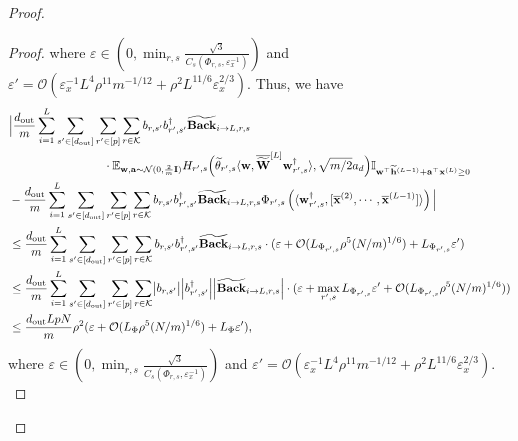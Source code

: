 \begin{claim}
\begin{proof}
\begin{proof}
					where $\varepsilon \in (0, \min_{r, s} \frac{\sqrt{3}}{C_s(\Phi_{r, s}, \varepsilon_x^{-1})})$ and  $\varepsilon' =  \mathcal{O}(\varepsilon_x^{-1} L^4 \rho^{11} m^{-1/12} + \rho^2 L^{11/6} \varepsilon_x^{2/3}).$ Thus, we have
					\begingroup \allowdisplaybreaks
					\begin{align}
						&\Big|\frac{d_{\mathrm{out}} }{m} \sum_{i=1}^{L}  \sum_{s' \in [d_{\mathrm{out}} ]} \sum_{r' \in [p]} \sum_{r \in \mathcal{K}}  b_{r, s'} b_{r', s'}^{\dagger} \widetilde{\mathbf{Back}}_{i \to L, r, s} \nonumber\\& \quad\quad\quad\quad \quad\quad\quad\quad \cdot  \mathbb{E}_{\mathbf{w}, \mathbf{a} \sim \mathcal{N}(0, \frac{2}{m}\mathbf{I})} H_{r', s}\Big(\widetilde{\theta}_{r', s} \langle \mathbf{w}, \overline{\widetilde{\mathbf{W}}}^{[L]} \mathbf{w}_{r', s}^{\dagger}\rangle, \sqrt{m/2} a_{d}\Big) \mathbb{I}_{\mathbf{w}^{\top} \widetilde{\mathbf{h}}^{(L-1)} + \mathbf{a}^{\top} \mathbf{x}^{(L)} \ge 0} \nonumber\\& - 
						\frac{d_{\mathrm{out}} }{m} \sum_{i=1}^{L}  \sum_{s' \in [d_{\mathrm{out}} ]} \sum_{r' \in [p]} \sum_{r \in \mathcal{K}}  b_{r, s'} b_{r', s'}^{\dagger} \widetilde{\mathbf{Back}}_{i \to L, r, s} \Phi_{r', s} \left( \langle     \mathbf{w}_{r', s}^{\dagger}, [\overline{\mathbf{x}}^{(2)}, \cdots, \overline{\mathbf{x}}^{(L-1)}] \rangle \right) \Big| \\& \le \frac{d_{\mathrm{out}} }{m} \sum_{i=1}^{L}  \sum_{s' \in [d_{\mathrm{out}} ]} \sum_{r' \in [p]} \sum_{r \in \mathcal{K}}  b_{r, s'} b_{r', s'}^{\dagger} \widetilde{\mathbf{Back}}_{i \to L, r, s} \cdot (\varepsilon + \mathcal{O}(L_{\Phi_{r', s}} \rho^5 (N/m)^{1/6}) + L_{\Phi_{r', s}}\varepsilon') \nonumber\\&
						\le \frac{d_{\mathrm{out}} }{m} \sum_{i=1}^{L}  \sum_{s' \in [d_{\mathrm{out}} ]} \sum_{r' \in [p]} \sum_{r \in \mathcal{K}}  \abs{b_{r, s'}} \abs{b_{r', s'}^{\dagger}} \abs{\widetilde{\mathbf{Back}}_{i \to L, r, s}} \cdot (\varepsilon + \max_{r', s} L_{\Phi_{r', s}}\varepsilon' + \mathcal{O}(L_{\Phi_{r', s}} \rho^5 (N/m)^{1/6})) \nonumber\\&
						\le \frac{d_{\mathrm{out}} LpN}{m} \rho^2 (\varepsilon + \mathcal{O}(L_{\Phi} \rho^5 (N/m)^{1/6}) + L_{\Phi}\varepsilon') \label{eq:expectedtheta},
					\end{align}
					\endgroup
					where $\varepsilon \in (0, \min_{r, s} \frac{\sqrt{3}}{C_s(\Phi_{r, s}, \varepsilon_x^{-1})})$ and  $\varepsilon' =  \mathcal{O}(\varepsilon_x^{-1} L^4 \rho^{11} m^{-1/12} + \rho^2 L^{11/6} \varepsilon_x^{2/3}).$ 

\end{proof}
\end{proof}
\end{claim}
